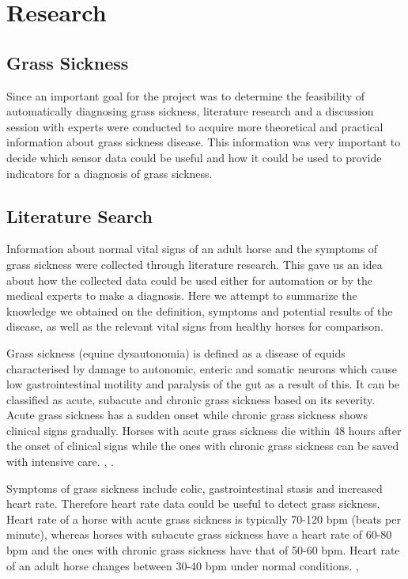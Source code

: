 \chapter{Research}
\label{chap:research}

\section{Grass Sickness}
Since an important goal for the project was to determine the feasibility of automatically diagnosing grass sickness, literature research and a discussion session with experts were conducted to acquire more theoretical and practical information about grass sickness disease. This information was very important to decide which sensor data could be useful and how it could be used to provide indicators for a diagnosis of grass sickness.  


\section{Literature Search}
Information about normal vital signs of an adult horse and the symptoms of grass sickness were collected through literature research. This gave us an idea about how the collected data could be used either for automation or by the medical experts to make a diagnosis. Here we attempt to summarize the knowledge we obtained on the definition, symptoms and potential results of the disease, as well as the relevant vital signs from healthy horses for comparison.

Grass sickness (equine dysautonomia) is defined as a disease of equids characterised by damage to autonomic, enteric and somatic neurons which cause low gastrointestinal motility and paralysis of the gut as a result of this. It can be classified as acute, subacute and chronic grass sickness based on its severity. Acute grass sickness has a sudden onset while chronic grass sickness shows clinical signs gradually. Horses with acute grass sickness die within 48 hours after the onset of clinical signs while the ones with chronic grass sickness can be saved with intensive care. \cite{robinson2009current}, \cite{edwards2010edaphic}.

Symptoms of grass sickness include colic, gastrointestinal stasis and increased heart rate. Therefore heart rate data could be useful to detect grass sickness. Heart rate of a horse with acute grass sickness is typically 70-120 bpm (beats per minute), whereas horses with subacute grass sickness have a heart rate of 60-80 bpm and the ones with chronic grass sickness have that of 50-60 bpm. Heart rate of an adult horse changes between 30-40 bpm under normal conditions. \cite{corley2009equine}, \cite{robinson2009current}

